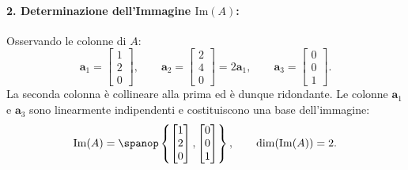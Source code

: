 \begin{example}
\paragraph{2. Determinazione dell'Immagine $\mathrm{Im}(A)$:}
Osservando le colonne di $A$:
\begin{equation}
    \mathbf{a}_1 = \begin{bmatrix} 1 \\ 2 \\ 0 \end{bmatrix}, \qquad \mathbf{a}_2 = \begin{bmatrix} 2 \\ 4 \\ 0 \end{bmatrix} = 2\mathbf{a}_1, \qquad \mathbf{a}_3 = \begin{bmatrix} 0 \\ 0 \\ 1 \end{bmatrix}.
\end{equation}
La seconda colonna \`e collineare alla prima ed \`e dunque ridondante. Le colonne $\mathbf{a}_1$ e $\mathbf{a}_3$ sono linearmente indipendenti e costituiscono una base dell'immagine:
\begin{equation}
    \mathrm{Im}(A) = \spanop\left\{ \begin{bmatrix} 1 \\ 2 \\ 0 \end{bmatrix}, \begin{bmatrix} 0 \\ 0 \\ 1 \end{bmatrix} \right\}, \qquad \dim(\mathrm{Im}(A)) = 2.
\end{equation}


\end{example}

